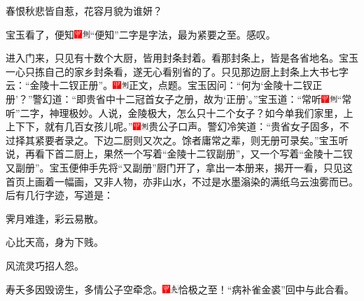 春恨秋悲皆自惹，花容月貌为谁妍？

宝玉看了，便知{\includegraphics[width=3mm]{../Images/00002}\includegraphics[width=3mm]{../Images/00011}\footnotesize \kaishu ``便知''二字是字法，最为紧要之至。}感叹。

进入门来，只见有十数个大厨，皆用封条封着。看那封条上，皆是各省地名。宝玉一心只拣自己的家乡封条看，遂无心看别省的了。只见那边厨上封条上大书七字云：``金陵十二钗正册''。{\includegraphics[width=3mm]{../Images/00002}\includegraphics[width=3mm]{../Images/00011}\footnotesize \kaishu 正文，点题。}宝玉因问：``何为`金陵十二钗正册'？''警幻道：``即贵省中十二冠首女子之册，故为`正册'。''宝玉道：``常听{\includegraphics[width=3mm]{../Images/00002}\includegraphics[width=3mm]{../Images/00011}\footnotesize \kaishu ``常听''二字，神理极妙。}人说，金陵极大，怎么只十二个女子？如今单我们家里，上上下下，就有几百女孩儿呢。''{\includegraphics[width=3mm]{../Images/00002}\includegraphics[width=3mm]{../Images/00011}\footnotesize \kaishu 贵公子口声。}警幻冷笑道：``贵省女子固多，不过择其紧要者录之。下边二厨则又次之。馀者庸常之辈，则无册可录矣。''宝玉听说，再看下首二厨上，果然一个写着``金陵十二钗副册''，又一个写着``金陵十二钗又副册''。宝玉便伸手先将``又副册''厨门开了，拿出一本册来，揭开一看，只见这首页上画着一幅画，又非人物，亦非山水，不过是水墨滃染的满纸乌云浊雾而已。后有几行字迹，写道是：

霁月难逢，彩云易散。

心比天高，身为下贱。

风流灵巧招人怨。

寿夭多因毁谤生，多情公子空牵念。{\includegraphics[width=3mm]{../Images/00002}\includegraphics[width=3mm]{../Images/00012}\footnotesize \kaishu 恰极之至！``病补雀金裘''回中与此合看。}

